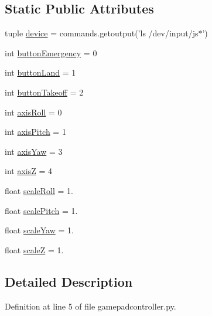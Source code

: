 \subsection*{Static Public Attributes}
\begin{DoxyCompactItemize}
\item 
tuple \hyperlink{classgamepadcontroller_1_1gamepadController_a2058f8060f1d8406118bcf0bb5e18729}{device} = commands.\-getoutput('ls /dev/input/js$\ast$')
\item 
int \hyperlink{classgamepadcontroller_1_1gamepadController_af4f9816a1459785ead61211c503b99b8}{button\-Emergency} = 0
\item 
int \hyperlink{classgamepadcontroller_1_1gamepadController_aa6a3832d0061812df791a90a098667a9}{button\-Land} = 1
\item 
int \hyperlink{classgamepadcontroller_1_1gamepadController_a2db2148491b5738f9b7e3eff5eafce2a}{button\-Takeoff} = 2
\item 
int \hyperlink{classgamepadcontroller_1_1gamepadController_ac74e4b60b29519689493aa031d5730aa}{axis\-Roll} = 0
\item 
int \hyperlink{classgamepadcontroller_1_1gamepadController_adc709abe90153ab637e44c009df3cb00}{axis\-Pitch} = 1
\item 
int \hyperlink{classgamepadcontroller_1_1gamepadController_ab7cb1425723b9954e1857744425aebac}{axis\-Yaw} = 3
\item 
int \hyperlink{classgamepadcontroller_1_1gamepadController_acd1ac84f9fc64a8e3ad69b5904b360c9}{axis\-Z} = 4
\item 
float \hyperlink{classgamepadcontroller_1_1gamepadController_a15894d1acf2099bde66ec5869cf36724}{scale\-Roll} = 1.
\item 
float \hyperlink{classgamepadcontroller_1_1gamepadController_a166739b1f1faef71ea463c544db75adf}{scale\-Pitch} = 1.
\item 
float \hyperlink{classgamepadcontroller_1_1gamepadController_a5b8de0ec2f3c6f1a81997266e1b91d24}{scale\-Yaw} = 1.
\item 
float \hyperlink{classgamepadcontroller_1_1gamepadController_a3d34de8357dd41a4a63cdb3dd38569d1}{scale\-Z} = 1.
\end{DoxyCompactItemize}


\subsection{Detailed Description}


Definition at line 5 of file gamepadcontroller.\-py.



